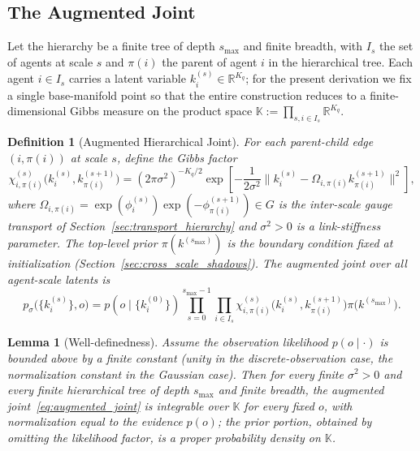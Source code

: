 \documentclass[11pt]{article}
\newtheorem{lemma}{Lemma}
\newtheorem{definition}{Definition}
\begin{document}
\subsection{The Augmented Joint}

Let the hierarchy be a finite tree of depth $s_{\max}$ and finite breadth, with $I_s$ the set of agents at scale $s$ and $\pi(i)$ the parent of agent $i$ in the hierarchical tree. Each agent $i \in I_s$ carries a latent variable $k_i^{(s)} \in \mathbb{R}^{K_q}$; for the present derivation we fix a single base-manifold point so that the entire construction reduces to a finite-dimensional Gibbs measure on the product space $\mathbb{K} := \prod_{s, i \in I_s} \mathbb{R}^{K_q}$.

\begin{definition}[Augmented Hierarchical Joint]
\label{def:augmented_joint}
For each parent-child edge $(i, \pi(i))$ at scale $s$, define the Gibbs factor
\begin{equation}
\chi_{i,\pi(i)}^{(s)}\big(k_i^{(s)}, k_{\pi(i)}^{(s+1)}\big)
=
(2\pi\sigma^2)^{-K_q/2} \exp\left[-\frac{1}{2\sigma^2}
\big\|k_i^{(s)} - \Omega_{i,\pi(i)}  k_{\pi(i)}^{(s+1)}\big\|^2\right],
\label{eq:gibbs_factor}
\end{equation}
where $\Omega_{i,\pi(i)} = \exp(\phi_i^{(s)})\exp(-\phi_{\pi(i)}^{(s+1)}) \in G$ is the inter-scale gauge transport of Section~\ref{sec:transport_hierarchy} and $\sigma^2 > 0$ is a link-stiffness parameter. The top-level prior $\pi(k^{(s_{\max})})$ is the boundary condition fixed at initialization (Section~\ref{sec:cross_scale_shadows}). The augmented joint over all agent-scale latents is
\begin{equation}
p_{\sigma}\big(\{k_i^{(s)}\}, o\big)
=
p(o \mid \{k_i^{(0)}\}) \prod_{s = 0}^{s_{\max}-1} \prod_{i \in I_s} \chi_{i,\pi(i)}^{(s)}\big(k_i^{(s)}, k_{\pi(i)}^{(s+1)}\big)  \pi\big(k^{(s_{\max})}\big).
\label{eq:augmented_joint}
\end{equation}
\end{definition}

\begin{lemma}[Well-definedness]
\label{lem:aug_joint_welldefined}
Assume the observation likelihood $p(o \mid \cdot)$ is bounded above by a finite constant (unity in the discrete-observation case, the normalization constant in the Gaussian case). Then for every finite $\sigma^2 > 0$ and every finite hierarchical tree of depth $s_{\max}$ and finite breadth, the augmented joint~\eqref{eq:augmented_joint} is integrable over $\mathbb{K}$ for every fixed $o$, with normalization equal to the evidence $p(o)$; the prior portion, obtained by omitting the likelihood factor, is a proper probability density on $\mathbb{K}$.
\end{lemma}
\end{document}
